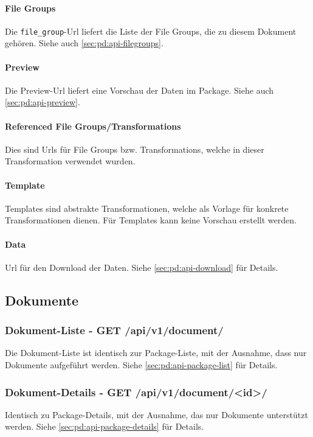 \paragraph{File Groups} Die \texttt{file\_group}-Url liefert die Liste der File Groups, die zu diesem Dokument gehören. Siehe auch \cref{sec:pd:api-filegroups}.

\paragraph{Preview} Die Preview-Url liefert eine Vorschau der Daten im Package. Siehe auch \cref{sec:pd:api-preview}.

\paragraph{Referenced File Groups/Transformations} Dies sind Urls für File Groups bzw. Transformations, welche in dieser Transformation verwendet wurden.

\paragraph{Template} Templates sind abstrakte Transformationen, welche als Vorlage für konkrete Transformationen dienen. Für Templates kann keine Vorschau erstellt werden.

\paragraph{Data} Url für den Download der Daten. Siehe \cref{sec:pd:api-download} für Details.

\subsection{Dokumente}
\subsubsection{Dokument-Liste - GET /api/v1/document/}
Die Dokument-Liste ist identisch zur Package-Liste, mit der Ausnahme, dass nur Dokumente aufgeführt werden. Siehe \cref{sec:pd:api-package-list} für Details.

\subsubsection{Dokument-Details - GET /api/v1/document/<id>/} \label{sec:pd:api-document-details}
Identisch zu Package-Details, mit der Ausnahme, das nur Dokumente unterstützt werden. Siehe \cref{sec:pd:api-package-details} für Details.

